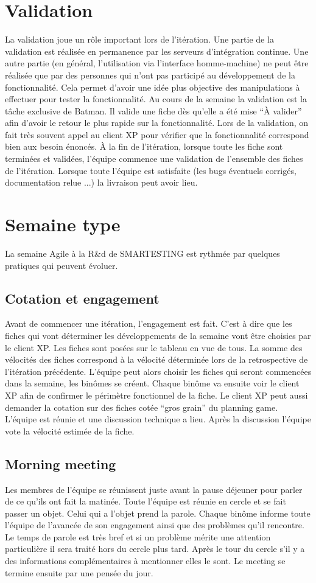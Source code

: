 \section{Validation}
La validation joue un rôle important lors de l'itération. Une partie de la validation est réalisée en permanence par les serveurs d'intégration continue. Une autre partie (en général, l'utilisation via l'interface homme-machine) ne peut être réalisée que par des personnes qui n'ont pas participé au développement de la fonctionnalité. Cela permet d'avoir une idée plus objective des manipulations à effectuer pour tester la fonctionnalité. Au cours de la semaine la validation est la tâche exclusive de Batman. Il valide une fiche dès qu'elle a été mise ``À valider'' afin d'avoir le retour le plus rapide sur la fonctionnalité. Lors de la validation, on fait très souvent appel au client XP pour vérifier que la fonctionnalité correspond bien aux besoin énoncés. À la fin de l'itération, lorsque toute les fiche sont terminées et validées, l'équipe commence une validation de l'ensemble des fiches de l'itération. Lorsque toute l'équipe est satisfaite (les bugs éventuels corrigés, documentation relue ...) la livraison peut avoir lieu.

\section{Semaine type}
La semaine Agile à la R\&d de SMARTESTING est rythmée par quelques pratiques qui peuvent évoluer.
\subsection*{Cotation et engagement}
Avant de commencer une itération, l'engagement est fait. C'est à dire que les fiches qui vont déterminer les développements de la semaine vont être choisies par le client XP. Les fiches sont posées sur le tableau en vue de tous. La somme des vélocités des fiches correspond à la vélocité déterminée lors de la retrospective de l'itération précédente. L'équipe peut alors choisir les fiches qui seront commencées dans la semaine, les binômes se créent. Chaque binôme va ensuite voir le client XP afin de confirmer le périmètre fonctionnel de la fiche. Le client XP peut aussi demander la cotation sur des fiches cotée ``gros grain'' du planning game. L'équipe est réunie et une discussion technique a lieu. Après la discussion l'équipe vote la vélocité estimée de la fiche. 

\subsection{Morning meeting}
Les membres de l'équipe se réunissent juste avant la pause déjeuner pour parler de ce qu'ils ont fait la matinée. Toute l'équipe est réunie en cercle et se fait passer un objet. Celui qui a l'objet prend la parole. Chaque binôme informe toute l'équipe de l'avancée de son engagement ainsi que des problèmes qu'il rencontre. Le temps de parole est très bref et si un problème mérite une attention particulière il sera traité hors du cercle plus tard. Après le tour du cercle s'il y a des informations complémentaires à mentionner elles le sont. Le meeting se termine ensuite par une pensée du jour.

